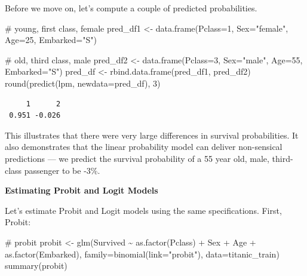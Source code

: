 \documentclass[
  letterpaper,
  DIV=11,
  numbers=noendperiod]{scrreprt}
\newenvironment{Shaded}{\begin{snugshade}}{\end{snugshade}}
\newcommand{\AttributeTok}[1]{\textcolor[rgb]{0.40,0.45,0.13}{#1}}
\newcommand{\CommentTok}[1]{\textcolor[rgb]{0.37,0.37,0.37}{#1}}
\newcommand{\DecValTok}[1]{\textcolor[rgb]{0.68,0.00,0.00}{#1}}
\newcommand{\FunctionTok}[1]{\textcolor[rgb]{0.28,0.35,0.67}{#1}}
\newcommand{\NormalTok}[1]{\textcolor[rgb]{0.00,0.23,0.31}{#1}}
\newcommand{\OtherTok}[1]{\textcolor[rgb]{0.00,0.23,0.31}{#1}}
\newcommand{\SpecialCharTok}[1]{\textcolor[rgb]{0.37,0.37,0.37}{#1}}
\newcommand{\StringTok}[1]{\textcolor[rgb]{0.13,0.47,0.30}{#1}}
\begin{document}
Before we move on, let's compute a couple of predicted probabilities.

\begin{Shaded}
\begin{Highlighting}[]
\CommentTok{\# young, first class, female}
\NormalTok{pred\_df1 }\OtherTok{\textless{}{-}} \FunctionTok{data.frame}\NormalTok{(}\AttributeTok{Pclass=}\DecValTok{1}\NormalTok{, }\AttributeTok{Sex=}\StringTok{"female"}\NormalTok{, }\AttributeTok{Age=}\DecValTok{25}\NormalTok{, }\AttributeTok{Embarked=}\StringTok{"S"}\NormalTok{)}

\CommentTok{\# old, third class, male}
\NormalTok{pred\_df2 }\OtherTok{\textless{}{-}} \FunctionTok{data.frame}\NormalTok{(}\AttributeTok{Pclass=}\DecValTok{3}\NormalTok{, }\AttributeTok{Sex=}\StringTok{"male"}\NormalTok{, }\AttributeTok{Age=}\DecValTok{55}\NormalTok{, }\AttributeTok{Embarked=}\StringTok{"S"}\NormalTok{)}
\NormalTok{pred\_df }\OtherTok{\textless{}{-}} \FunctionTok{rbind.data.frame}\NormalTok{(pred\_df1, pred\_df2)}
\FunctionTok{round}\NormalTok{(}\FunctionTok{predict}\NormalTok{(lpm, }\AttributeTok{newdata=}\NormalTok{pred\_df), }\DecValTok{3}\NormalTok{)}
\end{Highlighting}
\end{Shaded}

\begin{verbatim}
     1      2 
 0.951 -0.026 
\end{verbatim}

This illustrates that there were very large differences in survival
probabilities. It also demonstrates that the linear probability model
can deliver non-sensical predictions --- we predict the survival
probability of a 55 year old, male, third-class passenger to be -3\%.

\textbf{Estimating Probit and Logit Models}

Let's estimate Probit and Logit models using the same specifications.
First, Probit:

\begin{Shaded}
\begin{Highlighting}[]
\CommentTok{\# probit}
\NormalTok{probit }\OtherTok{\textless{}{-}} \FunctionTok{glm}\NormalTok{(Survived }\SpecialCharTok{\textasciitilde{}} \FunctionTok{as.factor}\NormalTok{(Pclass) }\SpecialCharTok{+}\NormalTok{ Sex }\SpecialCharTok{+}\NormalTok{ Age }\SpecialCharTok{+} \FunctionTok{as.factor}\NormalTok{(Embarked), }
              \AttributeTok{family=}\FunctionTok{binomial}\NormalTok{(}\AttributeTok{link=}\StringTok{"probit"}\NormalTok{), }
              \AttributeTok{data=}\NormalTok{titanic\_train)}
\FunctionTok{summary}\NormalTok{(probit)}
\end{Highlighting}
\end{Shaded}
\end{document}
